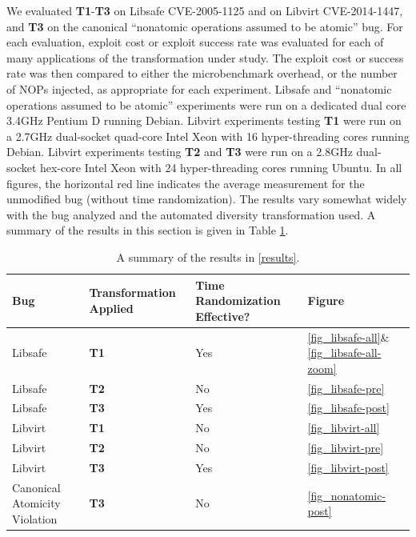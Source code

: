 We evaluated \textbf{T1}-\textbf{T3} on Libsafe CVE-2005-1125 and on Libvirt CVE-2014-1447, and \textbf{T3} on the canonical ``nonatomic operations assumed to be atomic'' bug.
For each evaluation, exploit cost or exploit success rate was evaluated for each of many applications of the transformation under study.
The exploit cost or success rate was then compared to either the microbenchmark overhead, or the number of NOPs injected, as appropriate for each experiment.
Libsafe and ``nonatomic operations assumed to be atomic'' experiments were run on a dedicated dual core 3.4GHz Pentium D running Debian.
Libvirt experiments testing \textbf{T1} were run on a 2.7GHz dual-socket quad-core Intel Xeon with 16 hyper-threading cores running Debian.
Libvirt experiments testing \textbf{T2} and \textbf{T3} were run on a 2.8GHz dual-socket hex-core Intel Xeon with 24 hyper-threading cores running Ubuntu.
In all figures, the horizontal red line indicates the average measurement for the unmodified bug (without time randomization).
The results vary somewhat widely with the bug analyzed and the automated diversity transformation used.
A summary of the results in this section is given in Table \ref{tab_results}.
\begin{table}
	\centering
	\begin{tabular}{ | p{0.6in} | p{0.6in} | p{0.6in} | p{0.6in} | }
	\hline
	Bug & Transfor\-mation Applied & Time Randomization Effective? & Figure \\ \hline
	\hline
	Libsafe & \textbf{T1} & Yes & \ref{fig_libsafe-all}\&\ref{fig_libsafe-all-zoom} \\ \hline
	Libsafe & \textbf{T2} & No & \ref{fig_libsafe-pre} \\ \hline
	Libsafe & \textbf{T3} & Yes & \ref{fig_libsafe-post} \\ \hline
	Libvirt & \textbf{T1} & No & \ref{fig_libvirt-all} \\ \hline
	Libvirt & \textbf{T2} & No & \ref{fig_libvirt-pre} \\ \hline
	Libvirt & \textbf{T3} & Yes & \ref{fig_libvirt-post} \\ \hline
	Canonical Atomicity Violation & \textbf{T3} & No & \ref{fig_nonatomic-post} \\ \hline
	\end{tabular}
	\caption{A summary of the results in \autoref{results}.}
	\label{tab_results}
\end{table}

